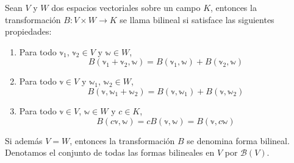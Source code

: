 \begin{definition}
    Sean $V$ y $W$ dos espacios vectoriales sobre un campo $K$, entonces la transformación $B: V \times W \longrightarrow K$ se llama bilineal si satisface las siguientes propiedades:
    \begin{enumerate}[label=\roman*)]
        \item Para todo $\mathbb{v}_1$, $\mathbb{v}_2 \in V$ y $\mathbb{w} \in W$,
        $$B(\mathbb{v}_1 + \mathbb{v}_2, \mathbb{w}) = B(\mathbb{v}_1, \mathbb{w}) + B(\mathbb{v}_2, \mathbb{w})$$\newpage
        \item Para todo $\mathbb{v} \in V$ y $\mathbb{w}_1$, $\mathbb{w}_2 \in W$,
        $$B(\mathbb{v}, \mathbb{w}_1 + \mathbb{w}_2) = B(\mathbb{v}, \mathbb{w}_1) + B(\mathbb{v}, \mathbb{w}_2)$$
        \item Para todo $\mathbb{v} \in V$, $\mathbb{w} \in W$ y $c \in K$,
        $$B(c\mathbb{v}, \mathbb{w}) = cB(\mathbb{v}, \mathbb{w}) = B(\mathbb{v}, c\mathbb{w})$$
    \end{enumerate}
    Si además $V = W$, entonces la transformación $B$ se denomina forma bilineal. Denotamos el conjunto de todas las formas bilineales en $V$ por $\mathcal{B}(V)$.
\end{definition}

